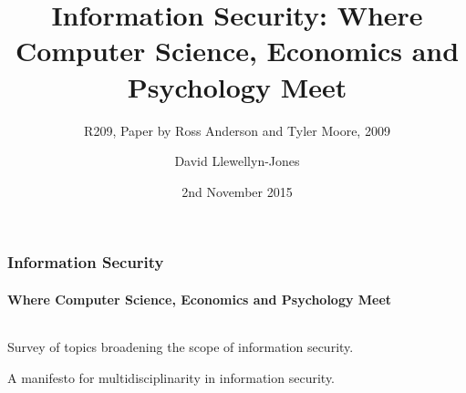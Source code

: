 \documentclass[handout, notes=hide]{beamer}
\begin{document}
\title{Information Security: Where Computer Science, Economics and Psychology Meet}
\subtitle{R209, Paper by Ross Anderson and Tyler Moore, 2009}
\author{David Llewellyn-Jones}
\date{2nd November 2015}


\frame{\titlepage}


\begin{frame}

\frametitle{Information Security}
\framesubtitle{Where Computer Science, Economics and Psychology Meet}
\begin{columns}[b]
\begin{column}[c]{0.5\textwidth}
\setlength{\parskip}{0.5em}

Survey of topics broadening the scope of information security.

A manifesto for multidisciplinarity in information security.


\end{column}
\end{columns}
\end{frame}
\end{document}
